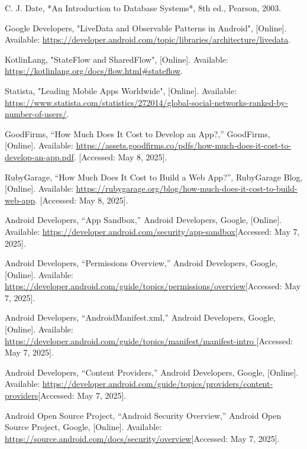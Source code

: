 \documentclass[12pt]{report}
\begin{document}
\begin{thebibliography}{1}

  C. J. Date, *An Introduction to Database Systems*, 8th ed., Pearson, 2003.
  
  Google Developers, "LiveData and Observable Patterns in Android", [Online]. Available: \url{https://developer.android.com/topic/libraries/architecture/livedata}.
  
  KotlinLang, "StateFlow and SharedFlow", [Online]. Available: \url{https://kotlinlang.org/docs/flow.html#stateflow}.
  
  Statista, "Leading Mobile Apps Worldwide", [Online]. Available: \url{https://www.statista.com/statistics/272014/global-social-networks-ranked-by-number-of-users/}.

  GoodFirms, “How Much Does It Cost to Develop an App?,” GoodFirms, [Online]. Available: \url{https://assets.goodfirms.co/pdfs/how-much-does-it-cost-to-develop-an-app.pdf}. [Accessed: May 8, 2025].

  RubyGarage, “How Much Does It Cost to Build a Web App?”, RubyGarage Blog, [Online]. Available: \url{https://rubygarage.org/blog/how-much-does-it-cost-to-build-web-app}. [Accessed: May 8, 2025].
  

  Android Developers, “App Sandbox,” Android Developers, Google, [Online]. Available: \url{https://developer.android.com/security/app-sandbox}[Accessed: May 7, 2025].
  
  Android Developers, “Permissions Overview,” Android Developers, Google, [Online]. Available: \url{https://developer.android.com/guide/topics/permissions/overview}[Accessed: May 7, 2025].
  
  Android Developers, “AndroidManifest.xml,” Android Developers, Google, [Online]. Available: \url{https://developer.android.com/guide/topics/manifest/manifest-intro }[Accessed: May 7, 2025].
   
  Android Developers, “Content Providers,” Android Developers, Google, [Online]. Available: \url{https://developer.android.com/guide/topics/providers/content-providers}[Accessed: May 7, 2025].
  
  Android Open Source Project, “Android Security Overview,” Android Open Source Project, Google, [Online]. Available: \url{https://source.android.com/docs/security/overview}[Accessed: May 7, 2025].
 

\end{thebibliography}
\end{document}
